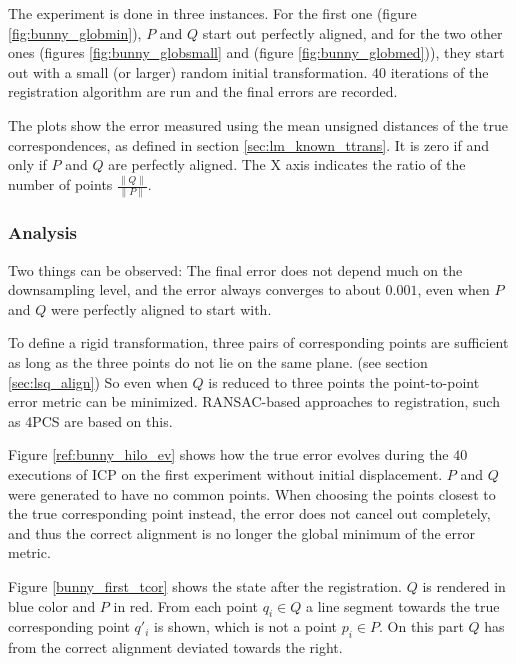 The experiment is done in three instances. For the first one (figure \ref{fig:bunny_globmin}), $P$ and $Q$ start out perfectly aligned, and for the two other ones (figures \ref{fig:bunny_globsmall} and (figure \ref{fig:bunny_globmed})), they start out with a small (or larger) random initial transformation. $40$ iterations of the registration algorithm are run and the final errors are recorded.

The plots show the error measured using the mean unsigned distances of the true correspondences, as defined in section \ref{sec:lm_known_ttrans}. It is zero if and only if $P$ and $Q$ are perfectly aligned. The X axis indicates the ratio of the number of points $\frac{\|Q\|}{\|P\|}$.


\subsubsection{Analysis}
Two things can be observed: The final error does not depend much on the downsampling level, and the error always converges to about $0.001$, even when $P$ and $Q$ were perfectly aligned to start with.

To define a rigid transformation, three pairs of corresponding points are sufficient as long as the three points do not lie on the same plane. (see section \ref{sec:lsq_align}) So even when $Q$ is reduced to three points the point-to-point error metric can be minimized. RANSAC-based approaches to registration, such as 4PCS are based on this.

Figure \ref{ref:bunny_hilo_ev} shows how the true error evolves during the $40$ executions of ICP on the first experiment without initial displacement. $P$ and $Q$ were generated to have no common points. When choosing the points closest to the true corresponding point instead, the error does not cancel out completely, and thus the correct alignment is no longer the global minimum of the error metric.

Figure \ref{bunny_first_tcor} shows the state after the registration. $Q$ is rendered in blue color and $P$ in red. From each point $q_i \in Q$ a line segment towards the true corresponding point $q'_i$ is shown, which is not a point $p_i \in P$. On this part $Q$ has from the correct alignment deviated towards the right.

